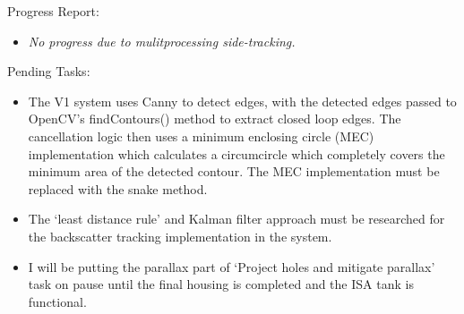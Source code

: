 Progress Report:

\begin{itemize}
    \item \textit{No progress due to mulitprocessing side-tracking.}
\end{itemize}

Pending Tasks:

\begin{itemize}
    \item The V1 system uses Canny to detect edges, with the detected edges passed to OpenCV's findContours() method to extract closed loop edges. The cancellation logic then uses a minimum enclosing circle (MEC) implementation which calculates a circumcircle which completely covers the minimum area of the detected contour. The MEC implementation must be replaced with the snake method.
    \item The `least distance rule' and Kalman filter approach must be researched for the backscatter tracking implementation in the system.
    \item I will be putting the parallax part of `Project holes and mitigate parallax' task on pause until the final housing is completed and the ISA tank is functional.
\end{itemize}
